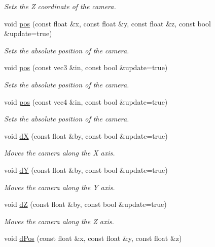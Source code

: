 \begin{DoxyCompactItemize}
\begin{DoxyCompactList}\small\item\em \-Sets the \-Z coordinate of the camera. \end{DoxyCompactList}\item 
void \hyperlink{class_camera_a432e03c15d63f8839fe4731016d907a4}{pos} (const float \&x, const float \&y, const float \&z, const bool \&update=true)
\begin{DoxyCompactList}\small\item\em \-Sets the absolute position of the camera. \end{DoxyCompactList}\item 
void \hyperlink{class_camera_ae9dc2206b71b25cf320a05d148cb8b56}{pos} (const vec3 \&in, const bool \&update=true)
\begin{DoxyCompactList}\small\item\em \-Sets the absolute position of the camera. \end{DoxyCompactList}\item 
void \hyperlink{class_camera_aec2115038562e514193bb2b67f5da153}{pos} (const vec4 \&in, const bool \&update=true)
\begin{DoxyCompactList}\small\item\em \-Sets the absolute position of the camera. \end{DoxyCompactList}\item 
void \hyperlink{class_camera_ac7985a6cb48f4e1e74fda17e5213dd74}{d\-X} (const float \&by, const bool \&update=true)
\begin{DoxyCompactList}\small\item\em \-Moves the camera along the \-X axis. \end{DoxyCompactList}\item 
void \hyperlink{class_camera_a59570a88e3ff2d277c9e995372fcadfe}{d\-Y} (const float \&by, const bool \&update=true)
\begin{DoxyCompactList}\small\item\em \-Moves the camera along the \-Y axis. \end{DoxyCompactList}\item 
void \hyperlink{class_camera_ab94ed9b3c7e12f484d6bfa5f827b59ff}{d\-Z} (const float \&by, const bool \&update=true)
\begin{DoxyCompactList}\small\item\em \-Moves the camera along the \-Z axis. \end{DoxyCompactList}\item 
void \hyperlink{class_camera_a2ac5f89b4f9f012dead66980925143c0}{d\-Pos} (const float \&x, const float \&y, const float \&z)

\end{DoxyCompactItemize}
